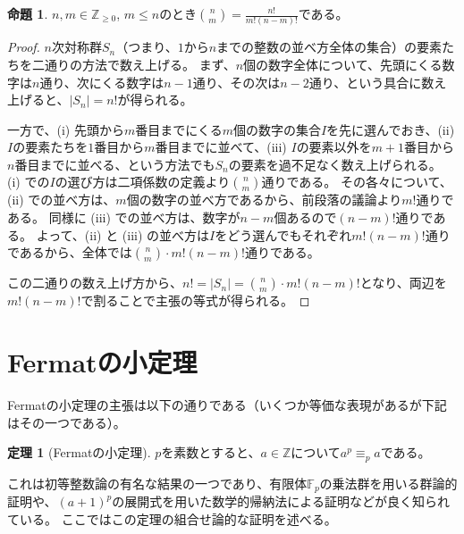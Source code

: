 ﻿\documentclass{ltjsarticle}
\theoremstyle{definition}
\newtheorem{proposition}{命題}
\newtheorem{theorem}{定理}
\begin{document}
\begin{proposition}
    \label{prop:binomial_coefficient_def}
    $n,m \in \mathbb{Z}_{\geq 0}$, $m \leq n$のとき$\displaystyle \binom{n}{m} = \frac{ n! }{ m! (n-m)! }$である。
\end{proposition}
\begin{proof}
    $n$次対称群$S_n$（つまり、$1$から$n$までの整数の並べ方全体の集合）の要素たちを二通りの方法で数え上げる。
    まず、$n$個の数字全体について、先頭にくる数字は$n$通り、次にくる数字は$n-1$通り、その次は$n-2$通り、という具合に数え上げると、$|S_n| = n!$が得られる。

    一方で、(i) 先頭から$m$番目までにくる$m$個の数字の集合$I$を先に選んでおき、(ii) $I$の要素たちを$1$番目から$m$番目までに並べて、(iii) $I$の要素以外を$m+1$番目から$n$番目までに並べる、という方法でも$S_n$の要素を過不足なく数え上げられる。
    (i) での$I$の選び方は二項係数の定義より$\binom{n}{m}$通りである。
    その各々について、(ii) での並べ方は、$m$個の数字の並べ方であるから、前段落の議論より$m!$通りである。
    同様に (iii) での並べ方は、数字が$n-m$個あるので$(n-m)!$通りである。
    よって、(ii) と (iii) の並べ方は$I$をどう選んでもそれぞれ$m! (n-m)!$通りであるから、全体では$\binom{n}{m} \cdot m! (n-m)!$通りである。

    この二通りの数え上げ方から、$n! = |S_n| = \binom{n}{m} \cdot m! (n-m)!$となり、両辺を$m! (n-m)!$で割ることで主張の等式が得られる。
\end{proof}


\section{Fermatの小定理}
\label{sec:Fermat's_Little_Theorem}

Fermatの小定理の主張は以下の通りである（いくつか等価な表現があるが下記はその一つである）。

\begin{theorem}
    [Fermatの小定理]
    \label{thm:Fermat's_Little_Theorem}
    $p$を素数とすると、$a \in \mathbb{Z}$について$a^p \equiv_p a$である。
\end{theorem}

これは初等整数論の有名な結果の一つであり、有限体$\mathbb{F}_p$の乗法群を用いる群論的証明や、$(a+1)^p$の展開式を用いた数学的帰納法による証明などが良く知られている。
ここではこの定理の組合せ論的な証明を述べる。
\end{document}
